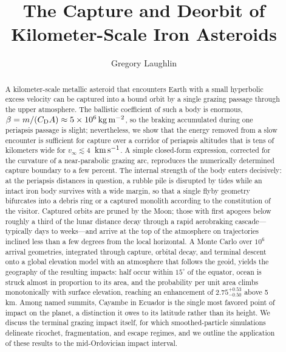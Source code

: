 \documentclass[twocolumn]{aastex701}
\newcommand{\vinf}{v_{\infty}}
\newcommand{\kms}{\ensuremath{{\rm \,km\,s^{-1}}}}
\begin{document}
\title{The Capture and Deorbit of Kilometer-Scale Iron Asteroids}

\author[0000-0002-3253-2621]{Gregory Laughlin}

\begin{abstract}
A kilometer-scale metallic asteroid that encounters Earth with a small
hyperbolic excess velocity can be captured into a bound orbit by a single
grazing passage through the upper atmosphere. The ballistic coefficient of
such a body is enormous, $\beta = m/(C_{\rm D}A) \approx 5\times10^{6}\,{\rm
kg\,m^{-2}}$, so the braking accumulated during one periapsis passage is
slight; nevertheless, we show that the energy removed from a slow encounter
is sufficient for capture over a corridor of periapsis altitudes that is
tens of kilometers wide for $\vinf \lesssim 4$ \kms. A simple closed-form
expression, corrected for the curvature of a near-parabolic grazing arc,
reproduces the numerically determined capture boundary to a few percent.
The internal strength of the body enters decisively: at the periapsis
distances in question, a rubble pile is disrupted by tides while an intact
iron body survives with a wide margin, so that a single flyby geometry
bifurcates into a debris ring or a captured monolith according to the
constitution of the visitor. Captured orbits are pruned by the Moon; those
with first apogees below roughly a third of the lunar distance decay
through a rapid aerobraking cascade---typically days to weeks---and arrive
at the top of the atmosphere on trajectories inclined less than a few
degrees from the local horizontal. A Monte Carlo over $10^{6}$ arrival
geometries, integrated through capture, orbital decay, and terminal descent
onto a global elevation model with an atmosphere that follows the geoid,
yields the geography of the resulting impacts: half occur within
$15^{\circ}$ of the equator, ocean is struck almost in proportion to its
area, and the probability per unit area climbs monotonically with surface
elevation, reaching an enhancement of $2.75^{+0.53}_{-0.50}$ above 5 km.
Among named summits, Cayambe in Ecuador is the single most favored point
of impact on the planet, a distinction it owes to its latitude rather than
its height. We discuss the terminal grazing impact itself, for which
smoothed-particle simulations delineate ricochet, fragmentation, and escape
regimes, and we outline the application of these results to the
mid-Ordovician impact interval.
\end{abstract}
\end{document}
